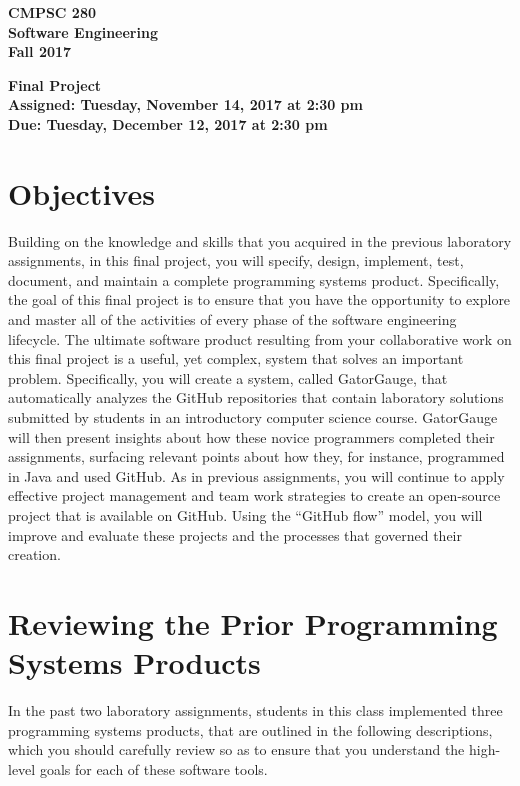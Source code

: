 \documentclass[11pt]{article}
\newcommand{\assignmentduedate}{December 12}
\newcommand{\assignmentassignedate}{November 14}
\newcommand{\labyear}{2017}
\newcommand{\labday}{Tuesday}
\newcommand{\labtime}{2:30 pm}
\newcommand{\assigneddate}{Assigned: \labday, \assignmentassignedate, \labyear{} at \labtime{}}
\newcommand{\duedate}{Due: \labday, \assignmentduedate, \labyear{} at \labtime{}}
\newcommand{\labtitle}[1]
{
  \begin{center}
    \begin{center}
      \bf
      CMPSC 280\\Software Engineering\\
      Fall 2017\\
      \medskip
    \end{center}
    \bf
    #1
  \end{center}
}
\begin{document}
\thispagestyle{empty}

\labtitle{Final Project \\ \assigneddate{} \\ \duedate{}}

\section*{Objectives}


Building on the knowledge and skills that you acquired in the previous laboratory assignments, in this final project,
you will specify, design, implement, test, document, and maintain a complete programming systems product. Specifically,
the goal of this final project is to ensure that you have the opportunity to explore and master all of the activities of
every phase of the software engineering lifecycle. The ultimate software product resulting from your collaborative work
on this final project is a useful, yet complex, system that solves an important problem. Specifically, you will create a
system, called GatorGauge, that automatically analyzes the GitHub repositories that contain laboratory solutions
submitted by students in an introductory computer science course. GatorGauge will then present insights about how these
novice programmers completed their assignments, surfacing relevant points about how they, for instance, programmed in
Java and used GitHub. As in previous assignments, you will continue to apply effective project management and team work
strategies to create an open-source project that is available on GitHub. Using the ``GitHub flow'' model, you will
improve and evaluate these projects and the processes that governed their creation.

\section*{Reviewing the Prior Programming Systems Products}

In the past two laboratory assignments, students in this class implemented three programming systems products, that are
outlined in the following descriptions, which you should carefully review so as to ensure that you understand the
high-level goals for each of these software tools.
\end{document}
